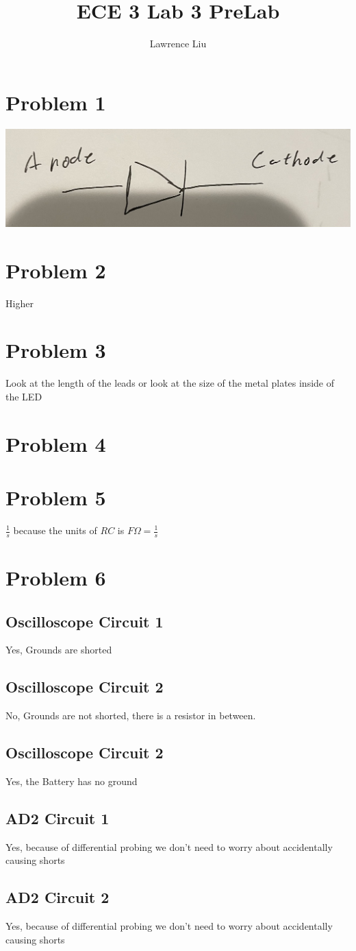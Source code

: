\documentclass[12pt]{article}
\title{ECE 3 Lab 3 PreLab}
\author{Lawrence Liu}
\begin{document}
\maketitle

\section*{Problem 1}
\includegraphics[scale=0.5]{Diode}
\section*{Problem 2}
Higher
\section*{Problem 3}
Look at the length of the leads or look at the size of the metal plates inside of the LED
\section*{Problem 4}

\section*{Problem 5}
$\frac{1}{s}$ because the units of $RC$ is $F\Omega=\frac{1}{s}$
\section*{Problem 6}
\subsection*{Oscilloscope Circuit 1}
Yes, Grounds are shorted
\subsection*{Oscilloscope Circuit 2}
No, Grounds are not shorted, there is a resistor in between. 
\subsection*{Oscilloscope Circuit 2}
Yes, the Battery has no ground
\subsection*{AD2 Circuit 1}
Yes, because of differential probing we don't need to worry about accidentally causing shorts
\subsection*{AD2 Circuit 2}
Yes, because of differential probing we don't need to worry about accidentally causing shorts
\end{document}
